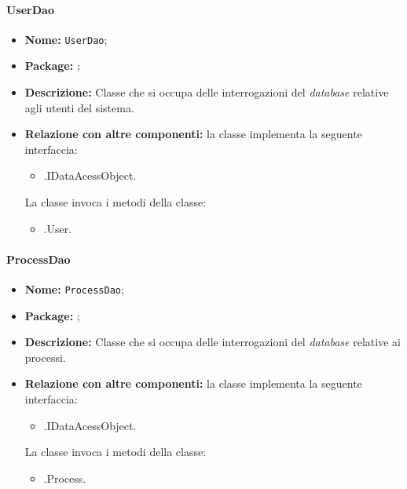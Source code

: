 \paragraph{UserDao}
\begin{itemize}
\item \textbf{Nome:} \texttt{UserDao};
\item \textbf{Package:} \texttt{\smodel{}};
\item \textbf{Descrizione:} Classe che si occupa delle interrogazioni del \textit{database} relative agli utenti del sistema.
\item \textbf{Relazione con altre componenti:} la classe implementa la seguente interfaccia:
		\begin{itemize}
			\item \smodel{}.IDataAcessObject.
		\end{itemize}
		La classe invoca i metodi della classe:
		\begin{itemize}
			\item \smodel{}.User.
		\end{itemize}
\end{itemize}

\paragraph{ProcessDao}
\begin{itemize}
\item \textbf{Nome:} \texttt{ProcessDao};
\item \textbf{Package:} \texttt{\smodel{}};
\item \textbf{Descrizione:} Classe che si occupa delle interrogazioni del \textit{database} relative ai processi.
\item \textbf{Relazione con altre componenti:} la classe implementa la seguente interfaccia:
		\begin{itemize}
			\item \smodel{}.IDataAcessObject.
		\end{itemize}
		La classe invoca i metodi della classe:
		\begin{itemize}
			\item \smodel{}.Process.
		\end{itemize}
\end{itemize}

